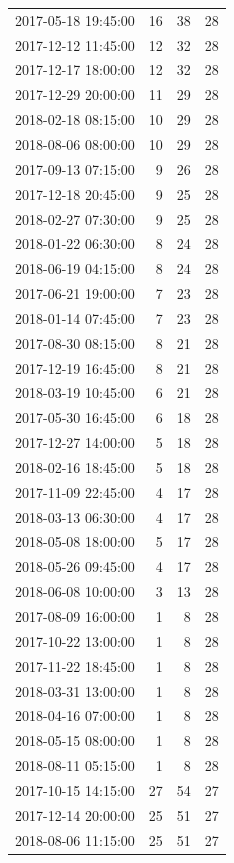 \begin{tabular}{lrrr}
2017-05-18 19:45:00 & 16 & 38 & 28 \\
2017-12-12 11:45:00 & 12 & 32 & 28 \\
2017-12-17 18:00:00 & 12 & 32 & 28 \\
2017-12-29 20:00:00 & 11 & 29 & 28 \\
2018-02-18 08:15:00 & 10 & 29 & 28 \\
2018-08-06 08:00:00 & 10 & 29 & 28 \\
2017-09-13 07:15:00 & 9 & 26 & 28 \\
2017-12-18 20:45:00 & 9 & 25 & 28 \\
2018-02-27 07:30:00 & 9 & 25 & 28 \\
2018-01-22 06:30:00 & 8 & 24 & 28 \\
2018-06-19 04:15:00 & 8 & 24 & 28 \\
2017-06-21 19:00:00 & 7 & 23 & 28 \\
2018-01-14 07:45:00 & 7 & 23 & 28 \\
2017-08-30 08:15:00 & 8 & 21 & 28 \\
2017-12-19 16:45:00 & 8 & 21 & 28 \\
2018-03-19 10:45:00 & 6 & 21 & 28 \\
2017-05-30 16:45:00 & 6 & 18 & 28 \\
2017-12-27 14:00:00 & 5 & 18 & 28 \\
2018-02-16 18:45:00 & 5 & 18 & 28 \\
2017-11-09 22:45:00 & 4 & 17 & 28 \\
2018-03-13 06:30:00 & 4 & 17 & 28 \\
2018-05-08 18:00:00 & 5 & 17 & 28 \\
2018-05-26 09:45:00 & 4 & 17 & 28 \\
2018-06-08 10:00:00 & 3 & 13 & 28 \\
2017-08-09 16:00:00 & 1 & 8 & 28 \\
2017-10-22 13:00:00 & 1 & 8 & 28 \\
2017-11-22 18:45:00 & 1 & 8 & 28 \\
2018-03-31 13:00:00 & 1 & 8 & 28 \\
2018-04-16 07:00:00 & 1 & 8 & 28 \\
2018-05-15 08:00:00 & 1 & 8 & 28 \\
2018-08-11 05:15:00 & 1 & 8 & 28 \\
2017-10-15 14:15:00 & 27 & 54 & 27 \\
2017-12-14 20:00:00 & 25 & 51 & 27 \\
2018-08-06 11:15:00 & 25 & 51 & 27 \\

\end{tabular}
